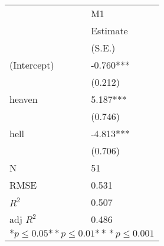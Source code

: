\begin{tabular}{*{2}{l}}
\hline
                  & M1   \tabularnewline
                   &Estimate \tabularnewline
                 &(S.E.) \tabularnewline
 \hline
 \hline
   (Intercept)     &-0.760*** \tabularnewline
                 &(0.212)  \tabularnewline
   heaven          &5.187*** \tabularnewline
                 &(0.746)  \tabularnewline
   hell            &-4.813*** \tabularnewline
                 &(0.706)  \tabularnewline
 \hline
 N                 &51       \tabularnewline
 RMSE             &0.531   \tabularnewline
 $R^2$             &0.507   \tabularnewline
 adj $R^2$         &0.486   \tabularnewline
 \hline
\hline
 
 \multicolumn{2}{c}{${*  p}\le 0.05$${*\!\!*  p}\le 0.01$${*\!\!*\!\!*  p}\le 0.001$}\tabularnewline
 \end{tabular}